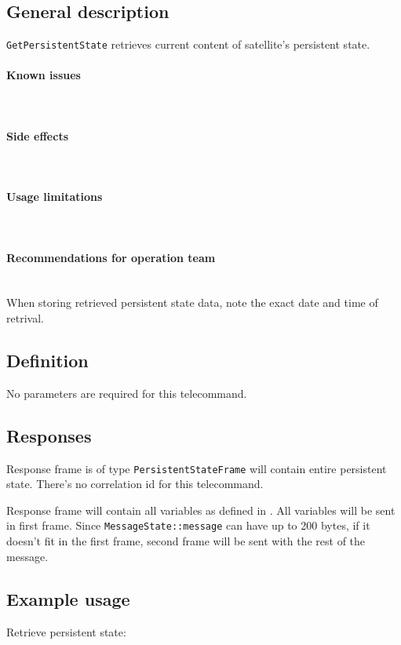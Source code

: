 

\subsection{General description}
\texttt{GetPersistentState} retrieves current content of satellite's persistent state. 

\paragraph{Known issues} \mbox{} \\
\None

\paragraph{Side effects} \mbox{} \\
\None

\paragraph{Usage limitations} \mbox{} \\
\None

\paragraph{Recommendations for operation team} \mbox{} \\
When storing retrieved persistent state data, note the exact date and time of retrival. 

\subsection{Definition}

No parameters are required for this telecommand.

\subsection{Responses}

Response frame is of type \texttt{PersistentStateFrame} will contain entire persistent state. There's no correlation id for this telecommand.

Response frame will contain all variables as defined in . All variables will be sent in first frame. Since \texttt{MessageState::message} can have up to 200 bytes, if it doesn't fit in the first frame, second frame will be sent with the rest of the message.

\subsection{Example usage}
Retrieve persistent state:

